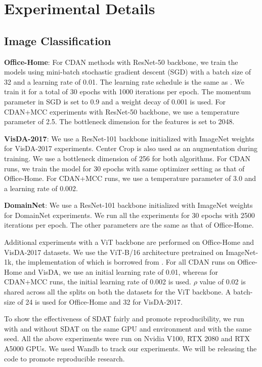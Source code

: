 \documentclass[table,dvipsnames]{article}
\theoremstyle{plain}
\theoremstyle{definition}
\theoremstyle{remark}
\begin{document}
\section{Experimental Details}\label{app:experimental_deets}
\label{exp_details}
\subsection{Image Classification}
\textbf{Office-Home}: For CDAN methods with ResNet-50 backbone, we train the models using mini-batch stochastic gradient descent (SGD) with a batch size of 32 and a learning rate of 0.01. The learning rate schedule is the same as \citep{ganin2016domain}. We train it for a total of 30 epochs with 1000 iterations per epoch. The momentum parameter in SGD is set to 0.9 and a weight decay of 0.001 is used. For CDAN+MCC experiments with ResNet-50 backbone, we use a temperature parameter \citep{jin2020minimum} of 2.5. The bottleneck dimension for the features is set to 2048.

\textbf{VisDA-2017}:
We use a ResNet-101 backbone initialized with ImageNet weights for VisDA-2017 experiments. Center Crop is also used as an augmentation during training. We use a bottleneck dimension of 256 for both algorithms.
For CDAN runs, we train the model for 30 epochs with same optimizer setting as that of Office-Home.
For CDAN+MCC runs, we use a temperature parameter of 3.0 and a learning rate of 0.002. 

\textbf{DomainNet}:
We use a ResNet-101 backbone initialized with ImageNet weights for DomainNet experiments.  We run all the experiments for 30 epochs with 2500 iterations per epoch. The other parameters are the same as that of Office-Home.

Additional experiments with a ViT backbone are performed on Office-Home and VisDA-2017 datasets. We use the ViT-B/16 architecture pretrained on ImageNet-1k, the implementation of which is borrowed from \cite{rw2019timm}. For all CDAN runs on Office-Home and VisDA, we use an initial learning rate of 0.01, whereas for CDAN+MCC runs, the initial learning rate of 0.002 is used. $\rho$ value of 0.02 is shared across all the splits on both the datasets for the ViT backbone. A batch-size of 24 is used for Office-Home and 32 for VisDA-2017. 

To show the effectiveness of SDAT fairly and promote reproducibility, we run with and without SDAT on the same GPU and environment and with the same seed. All the above experiments were run on Nvidia V100, RTX 2080 and RTX A5000 GPUs. We used Wandb \citep{wandb} to track our experiments. We will be releasing the code to promote reproducible research.
\end{document}
